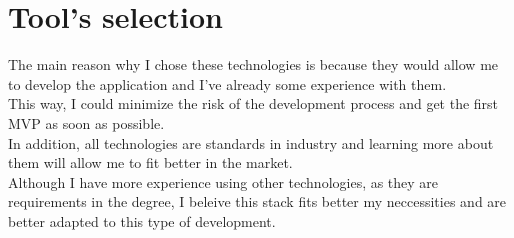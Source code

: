 \section{Tool's selection}
The main reason why I chose these technologies is because they would allow me to develop the application and I've already some experience with them. \\ 

This way, I could minimize the risk of the development process and get the first MVP as soon as possible. \\

In addition, all technologies are standards in industry and learning more about them will allow me to fit better in the market. \\ 

Although I have more experience using other technologies, as they are requirements in the degree, I beleive this stack fits better my neccessities and are better adapted to this type of development.

